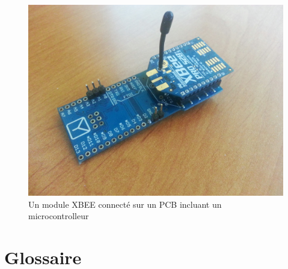 \documentclass{article}
\begin{document}
\begin{figure}[h!]
    \centering\includegraphics[width=\linewidth*2/3]{img/xbee_2.jpg}
    \caption{Un module XBEE connecté sur un PCB incluant un microcontrolleur}
\end{figure}

\clearpage

\section{Glossaire}
\label{glossaire}
\end{document}

